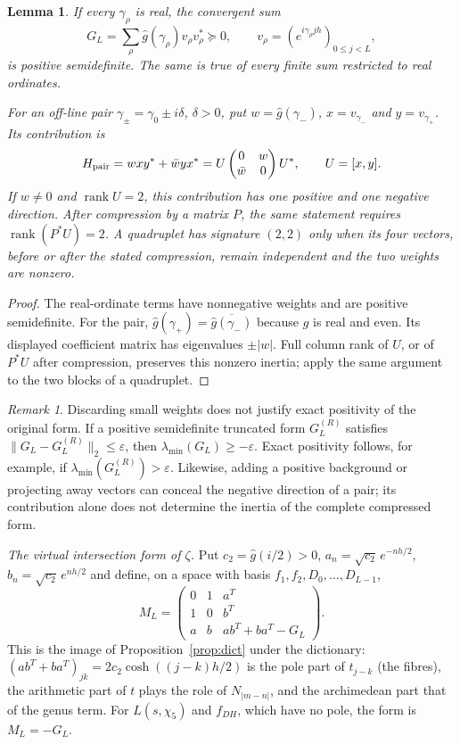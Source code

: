 \documentclass[11pt]{amsart}
\newtheorem{lemma}[proposition]{Lemma}
\theoremstyle{remark}
\newtheorem{remark}[proposition]{Remark}
\theoremstyle{definition}
\begin{document}
\begin{lemma}\label{lem:psd}
If every $\gamma_\rho$ is real, the convergent sum
\[
G_L=\sum_\rho\hat g(\gamma_\rho)v_\rho v_\rho^*\succeq0,
\qquad v_\rho=(e^{i\gamma_\rho jh})_{0\le j<L},
\]
is positive semidefinite. The same is true of every finite sum restricted to real ordinates.

For an off-line pair $\gamma_\pm=\gamma_0\pm i\delta$, $\delta>0$, put $w=\hat g(\gamma_-)$, $x=v_{\gamma_-}$ and $y=v_{\gamma_+}$. Its contribution is
\[
H_{\rm pair}=wxy^*+\bar w yx^*
=U\begin{pmatrix}0&w\\\bar w&0\end{pmatrix}U^*,\qquad U=[x,y].
\]
If $w\ne0$ and $\operatorname{rank}U=2$, this contribution has one positive and one negative direction. After compression by a matrix $P$, the same statement requires $\operatorname{rank}(P^*U)=2$. A quadruplet has signature $(2,2)$ only when its four vectors, before or after the stated compression, remain independent and the two weights are nonzero.
\end{lemma}
\begin{proof}
The real-ordinate terms have nonnegative weights and are positive semidefinite. For the pair, $\hat g(\gamma_+)=\overline{\hat g(\gamma_-)}$ because $g$ is real and even. Its displayed coefficient matrix has eigenvalues $\pm|w|$. Full column rank of $U$, or of $P^*U$ after compression, preserves this nonzero inertia; apply the same argument to the two blocks of a quadruplet.
\end{proof}

\begin{remark}\label{rem:approx}
Discarding small weights does not justify exact positivity of the original form. If a positive semidefinite truncated form $G_L^{(R)}$ satisfies $\|G_L-G_L^{(R)}\|_2\le\varepsilon$, then $\lambda_{\min}(G_L)\ge-\varepsilon$. Exact positivity follows, for example, if $\lambda_{\min}(G_L^{(R)})>\varepsilon$. Likewise, adding a positive background or projecting away vectors can conceal the negative direction of a pair; its contribution alone does not determine the inertia of the complete compressed form.
\end{remark}

\emph{The virtual intersection form of $\zeta$.} Put $c_2=\hat g(i/2)>0$, $a_n=\sqrt{c_2}\,e^{-nh/2}$, $b_n=\sqrt{c_2}\,e^{nh/2}$ and define, on a space with basis $f_1,f_2,D_0,\dots,D_{L-1}$,
\[
M_L=\begin{pmatrix}0&1&a^{T}\\1&0&b^{T}\\a&b&ab^{T}+ba^{T}-G_L\end{pmatrix}.
\]
This is the image of Proposition~\ref{prop:dict} under the dictionary: $(ab^T+ba^T)_{jk}=2c_2\cosh((j-k)h/2)$ is the pole part of $t_{j-k}$ (the fibres), the arithmetic part of $t$ plays the role of $N_{|m-n|}$, and the archimedean part that of the genus term. For $L(s,\chi_5)$ and $f_{DH}$, which have no pole, the form is $M_L=-G_L$.
\end{document}
